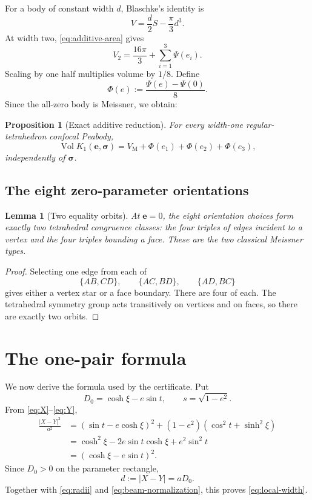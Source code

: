 \documentclass[11pt]{article}
\numberwithin{equation}{section}
\newtheorem{proposition}[theorem]{Proposition}
\newtheorem{lemma}[theorem]{Lemma}
\theoremstyle{remark}
\newcommand{\Vol}{\operatorname{Vol}}
\newcommand{\VM}{V_{\mathrm M}}
\begin{document}
For a body of constant width \(d\), Blaschke's identity is
\begin{equation}
  V=\frac d2S-\frac\pi3d^3.
  \label{eq:blaschke}
\end{equation}
At width two, \eqref{eq:additive-area} gives
\[
  V_2=\frac{16\pi}{3}+\sum_{i=1}^3\Psi(e_i).
\]
Scaling by one half multiplies volume by \(1/8\).  Define
\begin{equation}
  \Phi(e):=\frac{\Psi(e)-\Psi(0)}8.
  \label{eq:phi-def}
\end{equation}
Since the all-zero body is Meissner, we obtain:

\begin{proposition}[Exact additive reduction]
\label{prop:additive}
For every width-one regular-tetrahedron confocal Peabody,
\begin{equation}
  \Vol K_1(\mathbf e,\boldsymbol\sigma)
  =\VM+\Phi(e_1)+\Phi(e_2)+\Phi(e_3),
  \label{eq:additive-volume}
\end{equation}
independently of \(\boldsymbol\sigma\).
\end{proposition}

\subsection{The eight zero-parameter orientations}

\begin{lemma}[Two equality orbits]
\label{lem:orientation-orbits}
At \(\mathbf e=0\), the eight orientation choices form exactly two tetrahedral congruence classes: the four triples of edges incident to a vertex and the four triples bounding a face.  These are the two classical Meissner types.
\end{lemma}

\begin{proof}
Selecting one edge from each of
\[
  \{AB,CD\},\qquad \{AC,BD\},\qquad \{AD,BC\}
\]
gives either a vertex star or a face boundary.  There are four of each.  The tetrahedral symmetry group acts transitively on vertices and on faces, so there are exactly two orbits.
\end{proof}

\section{The one-pair formula}
\label{sec:pair}

We now derive the formula used by the certificate.  Put
\[
  D_0=\cosh\xi-e\sin t,
  \qquad s=\sqrt{1-e^2}.
\]
From \eqref{eq:X}--\eqref{eq:Y},
\begin{align*}
  \frac{|X-Y|^2}{a^2}
  &=(\sin t-e\cosh\xi)^2
    +(1-e^2)(\cos^2t+\sinh^2\xi)\\
  &=\cosh^2\xi-2e\sin t\cosh\xi+e^2\sin^2t\\
  &=(\cosh\xi-e\sin t)^2.
\end{align*}
Since \(D_0>0\) on the parameter rectangle,
\begin{equation}
  d:=|X-Y|=aD_0.
  \label{eq:d}
\end{equation}
Together with \eqref{eq:radii} and \eqref{eq:beam-normalization}, this proves \eqref{eq:local-width}.
\end{document}
